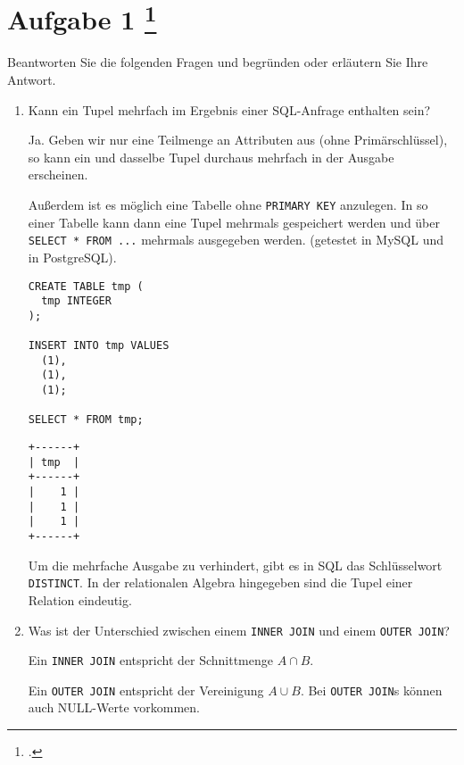 \documentclass{lehramt-informatik-aufgabe}
\begin{document}
\section{Aufgabe 1
\footcite{66116:2021:03}}

Beantworten Sie die folgenden Fragen und begründen oder erläutern Sie
Ihre Antwort.

\begin{enumerate}


\item Kann ein Tupel mehrfach im Ergebnis einer SQL-Anfrage enthalten
sein?

\begin{liAntwort}
Ja. Geben wir nur eine Teilmenge an Attributen aus (\zB ohne
Primärschlüssel), so kann ein und dasselbe Tupel durchaus mehrfach in
der Ausgabe erscheinen.

Außerdem ist es möglich eine Tabelle ohne \texttt{PRIMARY KEY}
anzulegen. In so einer Tabelle kann dann eine Tupel mehrmals gespeichert
werden und über \texttt{SELECT * FROM ...} mehrmals ausgegeben werden.
(getestet in MySQL und in PostgreSQL).

\begin{verbatim}
CREATE TABLE tmp (
  tmp INTEGER
);

INSERT INTO tmp VALUES
  (1),
  (1),
  (1);

SELECT * FROM tmp;
\end{verbatim}

\begin{verbatim}
+------+
| tmp  |
+------+
|    1 |
|    1 |
|    1 |
+------+
\end{verbatim}

Um die mehrfache Ausgabe zu verhindert, gibt es in SQL das
Schlüsselwort \texttt{DISTINCT}. In der relationalen Algebra hingegeben
sind die Tupel einer Relation eindeutig.
\end{liAntwort}


\item Was ist der Unterschied zwischen einem \texttt{INNER JOIN} und
einem \texttt{OUTER JOIN}?

\begin{liAntwort}
Ein \texttt{INNER JOIN} entspricht der Schnittmenge $A \cap B$.

Ein \texttt{OUTER JOIN} entspricht der Vereinigung $A \cup B$. Bei
\texttt{OUTER JOIN}s können auch NULL-Werte vorkommen.
\end{liAntwort}


\end{enumerate}
\end{document}
